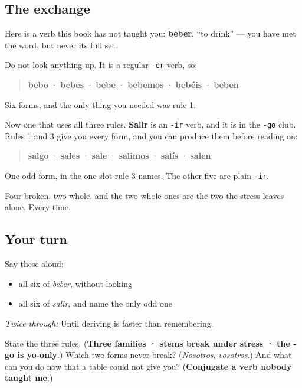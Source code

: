 \subsection*{The exchange}
Here is a verb this book has not taught you: \textbf{beber}, \textquotedblleft{}to drink\textquotedblright{} — you have met the word, but never its full set.

Do not look anything up. It is a regular \texttt{-er} verb, so:

\begin{quote}
\textbf{bebo} · \textbf{bebes} · \textbf{bebe} · \textbf{bebemos} · \textbf{bebéis} · \textbf{beben}
\end{quote}

Six forms, and the only thing you needed was rule 1.

Now one that uses all three rules. \textbf{Salir} is an \texttt{-ir} verb, and it is in the \texttt{-go} club. Rules 1 and 3 give you every form, and you can produce them before reading on:

\begin{quote}
\textbf{salgo} · \textbf{sales} · \textbf{sale} · \textbf{salimos} · \textbf{salís} · \textbf{salen}
\end{quote}

One odd form, in the one slot rule 3 names. The other five are plain \texttt{-ir}.

Four broken, two whole, and the two whole ones are the two the stress leaves alone. Every time.

\subsection*{Your turn}
Say these aloud:

\begin{itemize}
\raggedright
  \item all six of \emph{beber}, without looking
  \item all six of \emph{salir}, and name the only odd one
\end{itemize}

\emph{Twice through:} Until deriving is faster than remembering.

\begin{tcolorbox}[breakable,colback=teal!4,colframe=teal!35!black,title={Before you move on}]
State the three rules. (\textbf{Three families · stems break under stress · the -go is yo-only}.) Which two forms never break? (\emph{Nosotros}, \emph{vosotros}.) And what can you do now that a table could not give you? (\textbf{Conjugate a verb nobody taught me}.)
\end{tcolorbox}
